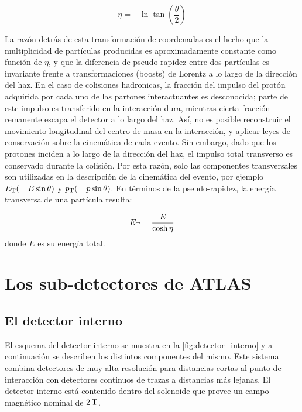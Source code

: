 \begin{equation}
  \eta = - \ln \tan \left( \frac{\theta}{2} \right)
\end{equation}

La razón detrás de esta transformación de coordenadas es el hecho que la
multiplicidad de partículas producidas es aproximadamente constante como función
de $\eta$, y que la diferencia de pseudo-rapidez entre dos partículas es
invariante frente a transformaciones (boosts) de Lorentz a lo largo de la
dirección del haz. En el caso de colisiones hadronicas, la fracción del impulso
del protón adquirida por cada uno de las partones interactuantes es desconocida;
parte de este impulso es transferido en la interacción dura, mientras cierta
fracción remanente escapa el detector a lo largo del haz. Así, no es posible
reconstruir el movimiento longitudinal del centro de masa en la interacción, y
aplicar leyes de conservación sobre la cinemática de cada evento. Sin embargo,
dado que los protones inciden a lo largo de la dirección del haz, el impulso
total transverso es conservado durante la colisión. Por esta razón, solo las
componentes transversales son utilizadas en la descripción de la cinemática del
evento, por ejemplo $E_{\mathrm{T}} (= E \sin \theta)$ y $p_{\mathrm{T}} (= p \sin \theta)$. En términos de
la pseudo-rapidez, la energía transversa de una partícula resulta:


\begin{equation}
  \et = \frac{E}{\cosh \eta}
\end{equation}
%
donde $E$ es su energía total.


\section{Los sub-detectores de ATLAS}


\subsection{El detector interno}

El esquema del detector interno se muestra en la
\cref{fig:detector_interno} y a continuación se describen los distintos componentes
del mismo. Este sistema combina detectores de muy alta
resolución para distancias cortas al punto de interacción con detectores
continuos de trazas a distancias más lejanas. El detector interno está contenido
dentro del solenoide que provee un campo magnético nominal de $\unit[2]{T}$.

